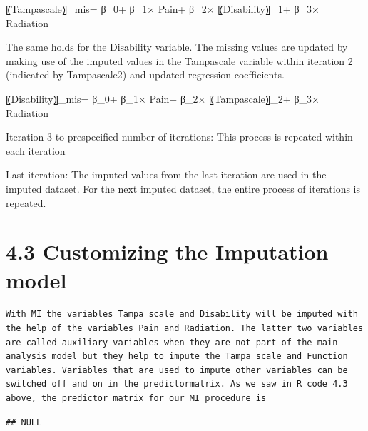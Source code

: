 \documentclass[]{book}
\newenvironment{Shaded}{\begin{snugshade}}{\end{snugshade}}
\newcommand{\OperatorTok}[1]{\textcolor[rgb]{0.81,0.36,0.00}{\textbf{#1}}}
\newcommand{\NormalTok}[1]{#1}
\theoremstyle{definition}
\theoremstyle{definition}
\theoremstyle{definition}
\theoremstyle{remark}
\begin{document}
〖Tampascale〗\_mis= β\_0+ β\_1× Pain+ β\_2× 〖Disability〗\_1+ β\_3×
Radiation

The same holds for the Disability variable. The missing values are
updated by making use of the imputed values in the Tampascale variable
within iteration 2 (indicated by Tampascale2) and updated regression
coefficients.

〖Disability〗\_mis= β\_0+ β\_1× Pain+ β\_2× 〖Tampascale〗\_2+ β\_3×
Radiation

Iteration 3 to prespecified number of iterations: This process is
repeated within each iteration

Last iteration: The imputed values from the last iteration are used in
the imputed dataset. For the next imputed dataset, the entire process of
iterations is repeated.

\section{4.3 Customizing the Imputation
model}\label{customizing-the-imputation-model}

\begin{verbatim}
With MI the variables Tampa scale and Disability will be imputed with the help of the variables Pain and Radiation. The latter two variables are called auxiliary variables when they are not part of the main analysis model but they help to impute the Tampa scale and Function variables. Variables that are used to impute other variables can be switched off and on in the predictormatrix. As we saw in R code 4.3 above, the predictor matrix for our MI procedure is
\end{verbatim}

\begin{Shaded}
\end{Shaded}

\begin{verbatim}
## NULL
\end{verbatim}
\end{document}
